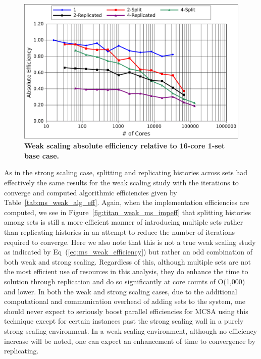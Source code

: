 \begin{figure}[t!]
  \begin{center}
    \includegraphics[width=6in]{chapters/parallel_mc/titan_weak_ms_eff.pdf}
  \end{center}
  \caption{\textbf{Weak scaling absolute efficiency relative to
      16-core 1-set base case.}}
  \label{fig:titan_weak_ms_eff}
\end{figure}

As in the strong scaling case, splitting and replicating histories
across sets had effectively the same results for the weak scaling
study with the iterations to converge and computed algorithmic
efficiencies given by Table~\ref{tab:ms_weak_alg_eff}. Again, when the
implementation efficiencies are computed, we see in
Figure~\ref{fig:titan_weak_ms_impeff} that splitting histories among
sets is still a more efficient manner of introducing multiple sets
rather than replicating histories in an attempt to reduce the number
of iterations required to converge.  Here we also note that this is
not a true weak scaling study as indicated by
Eq~(\ref{eq:ms_weak_efficiency}) but rather an odd combination of both
weak and strong scaling. Regardless of this, although multiple sets
are not the most efficient use of resources in this analysis, they do
enhance the time to solution through replication and do so
significantly at core counts of O(1,000) and lower. In both the weak
and strong scaling cases, due to the additional computational and
communication overhead of adding sets to the system, one should never
expect to seriously boost parallel efficiencies for MCSA using this
technique except for certain instances past the strong scaling wall in
a purely strong scaling environment. In a weak scaling environment,
although no efficiency increase will be noted, one can expect an
enhancement of time to convergence by replicating.

